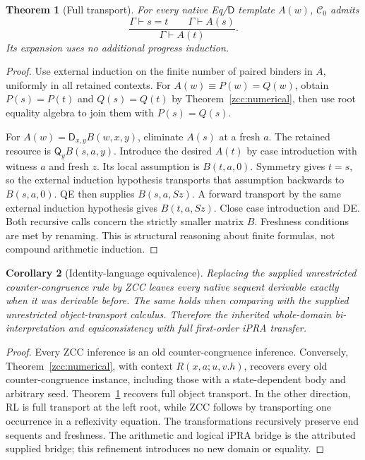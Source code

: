 \documentclass[11pt,letterpaper]{article}
\newtheorem{theorem}{Theorem}[section]
\newtheorem{corollary}[theorem]{Corollary}
\theoremstyle{definition}\newtheorem{definition}[theorem]{Definition}
\theoremstyle{remark}\newtheorem{remark}[theorem]{Remark}
\begin{document}
\begin{theorem}[Full transport]\label{zcc:formula}
For every native Eq/$\mathsf D$ template $A(w)$, $\mathcal C_0$ admits
\[
 \frac{\Gamma\vdash s=t\qquad\Gamma\vdash A(s)}
      {\Gamma\vdash A(t)}.
\]
Its expansion uses no additional progress induction.
\end{theorem}
\begin{proof}
Use external induction on the finite number of paired binders in $A$,
uniformly in all retained contexts. For $A(w)\equiv P(w)=Q(w)$, obtain
$P(s)=P(t)$ and $Q(s)=Q(t)$ by Theorem~\ref{zcc:numerical}, then use
root equality algebra to join them with $P(s)=Q(s)$.

For $A(w)=\mathsf D_{x,y}B(w,x,y)$, eliminate $A(s)$ at a fresh $a$.
The retained resource is $\mathsf Q_yB(s,a,y)$. Introduce the desired
$A(t)$ by case introduction with witness $a$ and fresh $z$. Its local
assumption is $B(t,a,0)$. Symmetry gives $t=s$, so the external induction
hypothesis transports that assumption backwards to $B(s,a,0)$.
QE then supplies $B(s,a,Sz)$. A forward transport by the same external
induction hypothesis gives $B(t,a,Sz)$. Close case introduction and DE.
Both recursive calls concern the strictly smaller matrix $B$. Freshness
conditions are met by renaming. This is structural reasoning about
finite formulas, not compound arithmetic induction.
\end{proof}

\begin{corollary}[Identity-language equivalence]\label{zcc:equivalence}
Replacing the supplied unrestricted counter-congruence rule by ZCC leaves
every native sequent derivable exactly when it was derivable before.
The same holds when comparing with the supplied unrestricted
object-transport calculus. Therefore the inherited whole-domain
bi-interpretation and equiconsistency with full first-order iPRA transfer.
\end{corollary}
\begin{proof}
Every ZCC inference is an old counter-congruence inference. Conversely,
Theorem~\ref{zcc:numerical}, with context $R(x,a;u,v.h)$, recovers every
old counter-congruence instance, including those with a state-dependent
body and arbitrary seed. Theorem~\ref{zcc:formula} recovers full object
transport. In the other direction, RL is full transport at the left
root, while ZCC follows by transporting one occurrence in a reflexivity
equation. The transformations recursively preserve end sequents and
freshness. The arithmetic and logical iPRA bridge is the attributed
supplied bridge; this refinement introduces no new domain or equality.
\end{proof}
\end{document}
